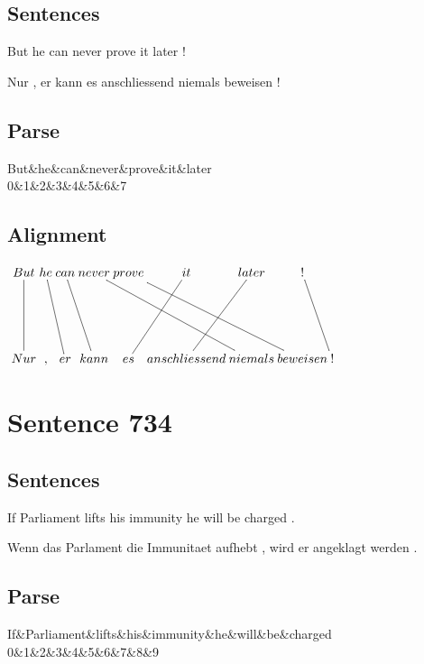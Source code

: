 \documentclass{report}
\begin{document}
\subsection*{Sentences}
But he can never prove it later !

\noindent Nur , er kann es anschliessend niemals beweisen !



\subsection*{Parse}
\begin{dependency}[theme=simple]
\begin{deptext}[column sep=.5cm, row sep=.1ex]
But\&he\&can\&never\&prove\&it\&later\\
0\&1\&2\&3\&4\&5\&6\&7\\
\end{deptext}
\end{dependency}


\subsection*{Alignment}
\scriptsize{
$
\xymatrix@C-2.3pc{
But \ar @{-} [dd] & he \ar @{-} [ddr] & can \ar @{-} [ddr] & never \ar @{-} [ddrrr] & prove \ar @{-} [ddrrr] & it \ar @{-} [ddl] & later \ar @{-} [ddl] & ! \ar @{-} [ddr]\\\\
Nur & , & er & kann & es & anschliessend & niemals & beweisen & !
}$}
\newpage\section*{Sentence 734}

\subsection*{Sentences}
If Parliament lifts his immunity he will be charged .

\noindent Wenn das Parlament die Immunitaet aufhebt , wird er angeklagt werden .



\subsection*{Parse}
\begin{dependency}[theme=simple]
\begin{deptext}[column sep=.5cm, row sep=.1ex]
If\&Parliament\&lifts\&his\&immunity\&he\&will\&be\&charged\\
0\&1\&2\&3\&4\&5\&6\&7\&8\&9\\
\end{deptext}
\end{dependency}
\end{document}
